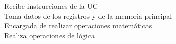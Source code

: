 \documentclass[preview]{standalone}
\begin{document}
Recibe instrucciones de la UC\\Toma datos de los registros y de la memoria principal\\Encargada de realizar operaciones matemáticas\\Realiza operaciones de lógica\\
\end{document}
